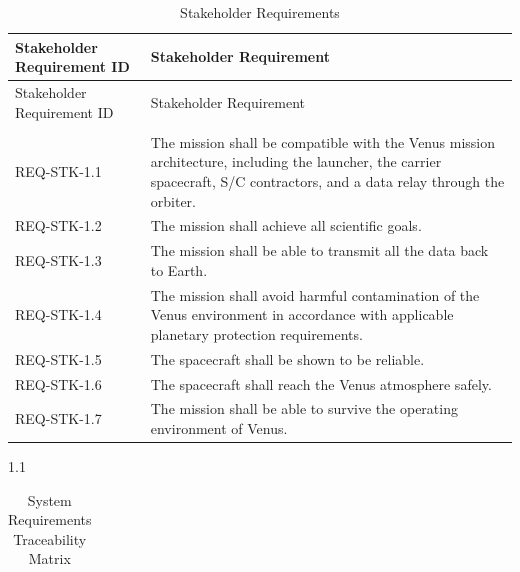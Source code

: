 {\small
\renewcommand{\arraystretch}{0.9}
\begin{longtable}{@{}
>{\raggedright\arraybackslash}p{}
>{\raggedright\arraybackslash}p{}
@{}}
\caption{Stakeholder Requirements} \label{tab:stakeholder_requirements} \\

\toprule
\textbf{Stakeholder Requirement ID} & \textbf{Stakeholder Requirement} \\
\midrule
\endfirsthead

\toprule
Stakeholder Requirement ID & Stakeholder Requirement \\
\midrule
\endhead

\midrule
\multicolumn{2}{r}{\small Continued on next page} \\
\endfoot

\bottomrule
\endlastfoot

REQ-STK-1.1 &
The mission shall be compatible with the Venus mission architecture, including the launcher, the carrier spacecraft, S/C contractors, and a data relay through the orbiter. \\

REQ-STK-1.2 &
The mission shall achieve all scientific goals. \\

REQ-STK-1.3 &
The mission shall be able to transmit all the data back to Earth. \\

REQ-STK-1.4 &
The mission shall avoid harmful contamination of the Venus environment in accordance with applicable planetary protection requirements. \\

REQ-STK-1.5 &
The spacecraft shall be shown to be reliable. \\

REQ-STK-1.6 &
The spacecraft shall reach the Venus atmosphere safely. \\

REQ-STK-1.7 &
The mission shall be able to survive the operating environment of Venus. \\
\end{longtable}

{\small
\renewcommand{\arraystretch}{0.9}
\begin{spacing}{1.1}
\begin{longtable}{@{}
>{\raggedright\arraybackslash}p{}
>{\raggedright\arraybackslash}p{}
>{\raggedright\arraybackslash}p{}
@{}}
\caption{System Requirements Traceability Matrix} \label{tab:requirements_traceability} \\


\end{longtable}
\end{spacing}}}
